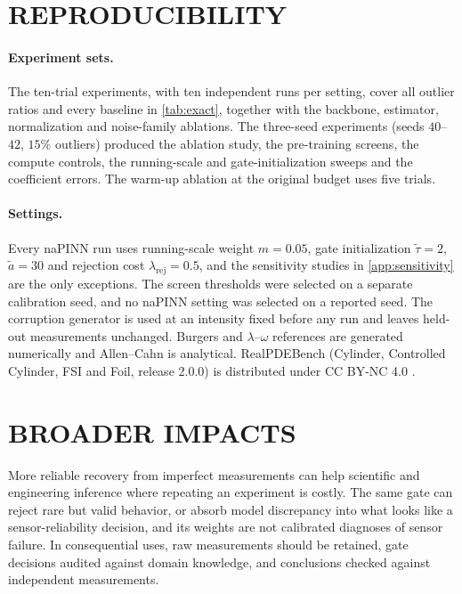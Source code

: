 \documentclass[twoside]{article}
\newcommand{\rej}{\lambda_{\mathrm{rej}}}
\begin{document}
\section{REPRODUCIBILITY}
\label{app:repro}

\paragraph{Experiment sets.}
The ten-trial experiments, with ten independent runs per setting, cover all
outlier ratios and every baseline in \cref{tab:exact}, together with the
backbone, estimator, normalization and noise-family ablations. The three-seed
experiments (seeds $40$--$42$, $15\%$ outliers) produced the ablation study, the
pre-training screens, the compute controls, the running-scale and
gate-initialization sweeps and the coefficient errors. The warm-up ablation at
the original budget uses five trials.

\paragraph{Settings.}
Every naPINN run uses running-scale weight $m = 0.05$, gate initialization
$\tilde\tau = 2$, $\tilde a = 30$ and rejection cost $\rej = 0.5$, and the sensitivity studies in
\cref{app:sensitivity} are the only exceptions. The screen thresholds were
selected on a separate calibration seed, and no naPINN setting was selected on a
reported seed.
The corruption generator is used at an intensity fixed before any run and leaves
held-out measurements unchanged. Burgers and $\lambda$--$\omega$ references are
generated numerically and Allen--Cahn is analytical. RealPDEBench (Cylinder,
Controlled Cylinder, FSI and Foil, release 2.0.0) is distributed under
CC BY-NC 4.0 \citep{hu2026realpdebench}.

\section{BROADER IMPACTS}
\label{app:impact}

More reliable recovery from imperfect measurements can help scientific and
engineering inference where repeating an experiment is costly. The same gate can
reject rare but valid behavior, or absorb model discrepancy into what looks like
a sensor-reliability decision, and its weights are not calibrated diagnoses of
sensor failure. In consequential uses, raw measurements should be retained, gate
decisions audited against domain knowledge, and conclusions checked against
independent measurements.
\end{document}
